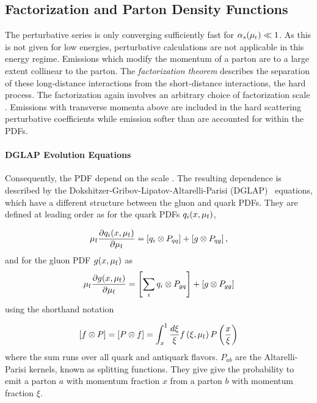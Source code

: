 \subsection{Factorization and Parton Density Functions}
\label{sec:factorization}

The perturbative series is only converging sufficiently fast for $\alpha_{s}(\mu_{\mathrm{r}}) \ll
1$. As this is not given for low energies, perturbative calculations are not
applicable in this energy regime. Emissions which modify the momentum of a
parton are to a large extent collinear to the parton. The \emph{factorization
theorem} describes the separation of these long-distance interactions from the
short-distance interactions, the hard process. The factorization again involves
an arbitrary choice of factorization scale \muf. Emissions with transverse
momenta above \muf are included in the hard scattering perturbative
coefficients while emission softer than \muf are accounted for within the PDFs.

\paragraph{DGLAP Evolution Equations}

Consequently, the PDF depend on the scale \muf. The resulting \muf dependence is
described by the Dokshitzer-Gribov-Lipatov-Altarelli-Parisi
(DGLAP)~\cite{Gribov:1972ri,Altarelli:1977zs,Dokshitzer:1977sg} equations, which
have a different structure between the gluon and quark PDFs. They are defined at
leading order as for the quark PDFs $q_i(x, \mu_{\mathrm{f}})$,

\begin{equation*}
    \mu_{\mathrm{f}} \frac{\partial q_i (x, \mu_{\mathrm{f}})}{\partial \mu_{\mathrm{f}}} = \left[ q_i \otimes P_{qq}
    \right] + \left[ g \otimes P_{qg} \right],
\end{equation*}
%
and for the gluon PDF $g(x, \mu_{\mathrm{f}})$ as
%
\begin{equation*}
    \mu_{\mathrm{f}} \frac{\partial g (x, \mu_{\mathrm{f}})}{\partial \mu_{\mathrm{f}}} = \left[\sum_i  q_i \otimes P_{gq}
    \right] + \left[g \otimes P_{gg}\right]
\end{equation*}
%
using the shorthand notation

\begin{equation*}
    \left[f \otimes P \right] = \left[ P \otimes f \right] = \int_x^1 \frac{d
    \xi}{\xi} f\left(\xi, \mu_{\mathrm{f}}\right) P\left( \frac{x}{\xi} \right)
\end{equation*}
%
where the sum runs over all quark and antiquark flavors. $P_{ab}$ are
the Altarelli-Parisi kernels, known as splitting functions. They give give the
probability to emit a parton $a$ with momentum fraction $x$ from a parton $b$
with momentum fraction $\xi$.

